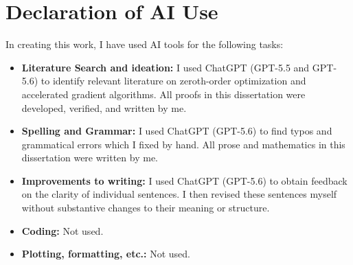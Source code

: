 \chapter*{Declaration of AI Use}
In creating this work, I have used AI tools for the following tasks:
\begin{itemize}
    \item \textbf{Literature Search and ideation:} I used ChatGPT (GPT-5.5 and GPT-5.6) to identify relevant literature on zeroth-order optimization and accelerated gradient algorithms. All proofs in this dissertation were developed, verified, and written by me. 
    \item \textbf{Spelling and Grammar:} I used ChatGPT (GPT-5.6) to find typos and grammatical errors which I fixed by hand. All prose and mathematics in this dissertation were written by me.
    \item \textbf{Improvements to writing:} I used ChatGPT (GPT-5.6) to obtain feedback on the clarity of individual sentences. I then revised these sentences myself without substantive changes to their meaning or structure.
    \item \textbf{Coding:} Not used.
    \item \textbf{Plotting, formatting, etc.:} Not used.
\end{itemize}